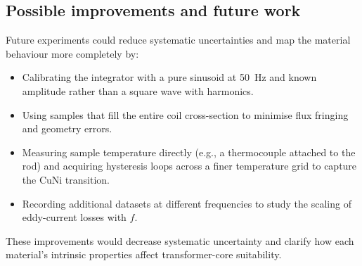 \subsection{Possible improvements and future work}
Future experiments could reduce systematic uncertainties and map the material behaviour more completely by:
\begin{itemize}
  \item Calibrating the integrator with a pure sinusoid at \SI{50}{\hertz} and known amplitude rather than a square wave with harmonics.
  \item Using samples that fill the entire coil cross-section to minimise flux fringing and geometry errors.
  \item Measuring sample temperature directly (e.g., a thermocouple attached to the rod) and acquiring hysteresis loops across a finer temperature grid to capture the CuNi transition.
  \item Recording additional datasets at different frequencies to study the scaling of eddy-current losses with $f$.
\end{itemize}
These improvements would decrease systematic uncertainty and clarify how each material's intrinsic properties affect transformer-core suitability.
